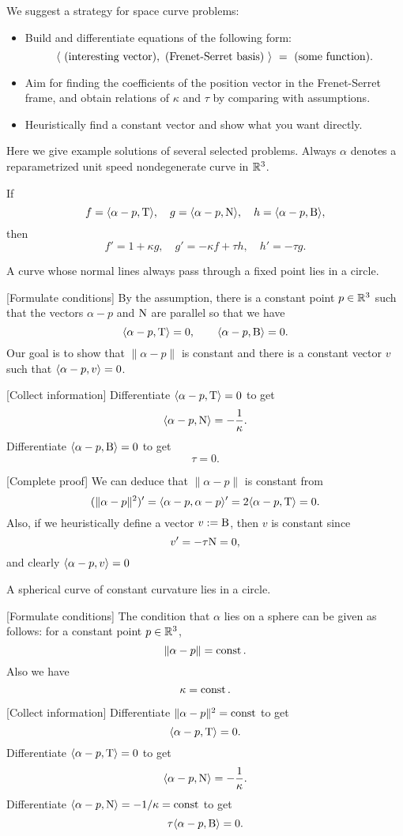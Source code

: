 \documentclass{../note}
\def\a{\alpha}
\begin{document}
\begin{prb}
We suggest a strategy for space curve problems:
\begin{itemize}
\item Build and differentiate equations of the following form:
\[\<\ \text{(interesting vector)},\ \text{(Frenet-Serret basis)}\ \>\ =\ \text{(some function)}.\]
\item Aim for finding the coefficients of the position vector in the Frenet-Serret frame, and obtain relations of $\kappa$ and $\tau$ by comparing with assumptions.
\item Heuristically find a constant vector and show what you want directly.
\end{itemize}
Here we give example solutions of several selected problems.
Always $\a$ denotes a reparametrized unit speed nondegenerate curve in $\mathbb{R}^3$.


If
\[f=\<\a-p,\rT\>,\quad g=\<\a-p,\rN\>,\quad h=\<\a-p,\rB\>,\]
then
\[f'=1+\kappa g,\quad g'=-\kappa f+\tau h,\quad h'=-\tau g.\]

\begin{prb}
A curve whose normal lines always pass through a fixed point lies in a circle.
\end{prb}
\begin{sol}
[Formulate conditions]
By the assumption, there is a constant point $p\in\mathbb{R}^3$ such that the vectors $\a-p$ and $\mathrm{N}$ are parallel so that we have
\[\<\a-p,\rT\>=0,\qquad\<\a-p,\rB\>=0.\]
Our goal is to show that $\|\a-p\|$ is constant and there is a constant vector $v$ such that $\<\a-p,v\>=0$.

[Collect information]
Differentiate $\<\a-p,\rT\>=0$ to get
\[\<\a-p,\rN\>=-\frac1\kappa.\]
Differentiate $\<\a-p,\rB\>=0$ to get
\[\tau=0.\]

[Complete proof]
We can deduce that $\|\a-p\|$ is constant from
\[(\|\a-p\|^2)'=\<\a-p,\a-p\>'=2\<\a-p,\rT\>=0.\]
Also, if we heuristically define a vector $v:=\mathrm{B}$, then $v$ is constant since
\[v'=-\tau\mathrm{N}=0,\]
and clearly $\<\a-p,v\>=0$
\end{sol}

\begin{prb}
A spherical curve of constant curvature lies in a circle.
\end{prb}
\begin{sol}
[Formulate conditions]
The condition that $\a$ lies on a sphere can be given as follows: for a constant point $p\in\mathbb{R}^3$,
\[\|\a-p\|=\const.\]
Also we have
\[\kappa=\operatorname{const}.\]

[Collect information]
Differentiate $\|\a-p\|^2=\const$ to get
\[\<\a-p,\rT\>=0.\]
Differentiate $\<\a-p,\rT\>=0$ to get
\[\<\a-p,\rN\>=-\frac1\kappa.\]
Differentiate $\<\a-p,\rN\>=-1/\kappa=\const$ to get
\[\tau\<\a-p,\rB\>=0.\]


\end{sol}
\end{prb}
\end{document}
